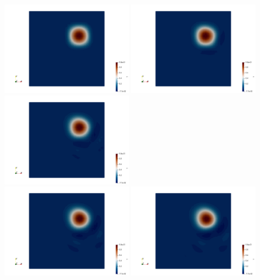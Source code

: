 \begin{center}
\includegraphics[width=5.6cm]{python_codes/fieldstone_45/results/norandom/T.0000.png}
\includegraphics[width=5.6cm]{python_codes/fieldstone_45/results/norandom/T.0001.png}
\includegraphics[width=5.6cm]{python_codes/fieldstone_45/results/norandom/T.0002.png}\\
\includegraphics[width=5.6cm]{python_codes/fieldstone_45/results/norandom/T.0003.png}
\includegraphics[width=5.6cm]{python_codes/fieldstone_45/results/norandom/T.0004.png}

\end{center}
